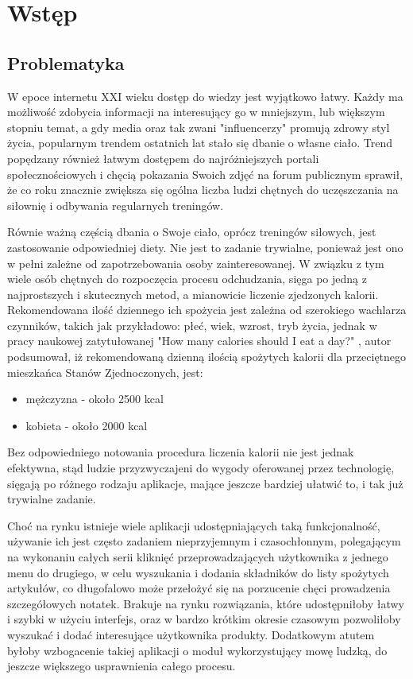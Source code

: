 \documentclass[12pt, a4paper]{article}
\begin{document}
\begin{sloppypar}


\tableofcontents
\newpage

\section{Wstęp}
{
  \subsection{Problematyka}
  {
    W epoce internetu XXI wieku dostęp do wiedzy jest wyjątkowo łatwy. Każdy ma możliwość
    zdobycia informacji na interesujący go w mniejszym, lub większym stopniu temat,
    a gdy media oraz tak zwani "influencerzy" promują zdrowy
    styl życia, popularnym trendem ostatnich lat stało się dbanie o własne ciało. 
    Trend popędzany również łatwym dostępem do najróżniejszych portali
    społecznościowych i chęcią pokazania Swoich zdjęć na forum publicznym sprawił, 
    że co roku znacznie zwiększa się ogólna liczba ludzi chętnych do uczęszczania na
    siłownię i odbywania regularnych treningów.

    Równie ważną częścią dbania o Swoje ciało, oprócz treningów siłowych, jest 
    zastosowanie odpowiedniej diety. Nie jest to zadanie trywialne, ponieważ jest 
    ono w pełni zależne od zapotrzebowania osoby zainteresowanej. W związku z tym
    wiele osób chętnych do rozpoczęcia procesu odchudzania, sięga po jedną z
    najprostszych i skutecznych metod, a mianowicie liczenie zjedzonych kalorii.
    Rekomendowana ilość dziennego ich spożycia jest zależna od szerokiego wachlarza
    czynników, takich jak przykładowo: płeć, wiek, wzrost, tryb życia, 
    jednak w pracy naukowej zatytułowanej "How many calories should I eat a day?"
    \cite{cal}, autor podsumował, iż rekomendowaną dzienną ilością spożytych kalorii 
    dla przeciętnego mieszkańca Stanów Zjednoczonych, jest:
    \begin{itemize}
      \item mężczyzna - około 2500 kcal
      \item kobieta - około 2000 kcal
    \end{itemize}
    Bez odpowiedniego notowania procedura liczenia kalorii nie jest jednak efektywna, 
    stąd ludzie przyzwyczajeni do wygody oferowanej przez technologię, sięgają po 
    różnego rodzaju aplikacje, mające jeszcze bardziej ułatwić to, i tak już trywialne
    zadanie.

    Choć na rynku istnieje wiele aplikacji udostępniających taką funkcjonalność,
    używanie ich jest często zadaniem nieprzyjemnym i czasochłonnym, polegającym
    na wykonaniu całych serii kliknięć przeprowadzających użytkownika z jednego menu
    do drugiego, w celu wyszukania i dodania składników do listy spożytych artykułów,
    co długofalowo może przełożyć się na porzucenie chęci prowadzenia szczegółowych
    notatek. Brakuje na rynku rozwiązania, które udostępniłoby łatwy i szybki
    w użyciu interfejs, oraz w bardzo krótkim okresie czasowym pozwoliłoby wyszukać 
    i dodać interesujące użytkownika produkty. Dodatkowym atutem byłoby wzbogacenie
    takiej aplikacji o moduł wykorzystujący mowę ludzką, do jeszcze większego 
    usprawnienia całego procesu.
  }
}
\end{sloppypar}
\end{document}
